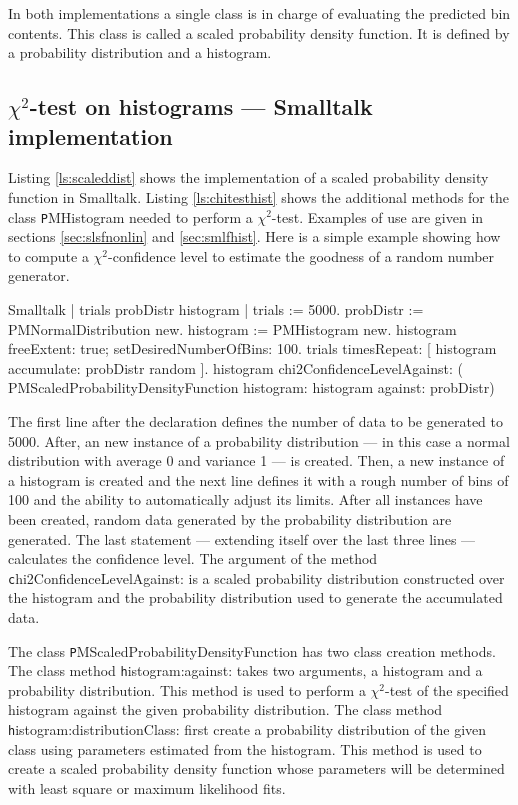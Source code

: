 In both implementations a single class is in charge of evaluating
the predicted bin contents. This class is called a scaled
probability density function. It is defined by a probability
distribution and a histogram.

\subsection{$\chi^2$-test on histograms --- Smalltalk implementation}
 Listing
\ref{ls:scaleddist} shows the implementation of a scaled
probability density function in Smalltalk. Listing
\ref{ls:chitesthist} shows the additional methods for the class
{\texttt PMHistogram} needed to perform a $\chi^2$-test. Examples of
use are given in sections \ref{sec:slsfnonlin} and
\ref{sec:smlfhist}. Here is a simple example showing how to
compute a $\chi^2$-confidence level to estimate the goodness of a
random number generator.
\begin{displaycode}{Smalltalk}
\label{exs:chitest}
 | trials probDistr histogram |
 trials := 5000.
 probDistr := PMNormalDistribution new.
 histogram := PMHistogram new.
 histogram freeExtent: true; setDesiredNumberOfBins: 100.
 trials timesRepeat: [ histogram accumulate: probDistr random ].
 histogram chi2ConfidenceLevelAgainst:
        ( PMScaledProbabilityDensityFunction histogram: histogram
                                          against: probDistr)
\end{displaycode}
The first line after the declaration defines the number of data to
be generated to 5000. After, an new instance of a probability
distribution --- in this case a normal distribution with average 0
and variance 1 --- is created. Then, a new instance of a histogram
is created and the next line defines it with a rough number of
bins of 100 and the ability to automatically adjust its limits.
After all instances have been created, random data generated by
the probability distribution are generated. The last statement
--- extending itself over the last three lines --- calculates
the confidence level. The argument of the method {\texttt
chi2ConfidenceLevelAgainst:} is a scaled probability distribution
constructed over the histogram and the probability distribution
used to generate the accumulated data.

The class {\texttt PMScaledProbabilityDensityFunction} has two class
creation methods. The class method {\texttt histogram:against:} takes
two arguments, a histogram and a probability distribution. This
method is used to perform a $\chi^2$-test of the specified
histogram against the given probability distribution. The class
method {\texttt histogram:distributionClass:} first create a
probability distribution of the given class using parameters
estimated from the histogram. This method is used to create a
scaled probability density function whose parameters will be
determined with least square or maximum likelihood fits.

